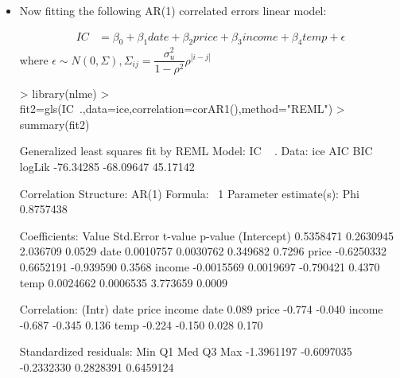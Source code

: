 \documentclass[12pt]{article}
\begin{document}
\begin{itemize}
\item Now fitting the following AR(1) correlated errors linear model: 

\begin{equation*}
\begin{aligned}
IC &= \beta_0 + \beta_1 date +  \beta_2 price + \beta_3 income + \beta_4 temp + \epsilon
\end{aligned}
\end{equation*}
where $\epsilon \sim N(0,\Sigma), \Sigma_{ij}=\dfrac{\sigma_u^2}{1-\rho^2}\rho^{|i-j|}$\\

\begin{Schunk}
\begin{Sinput}
> library(nlme)
> fit2=gls(IC~.,data=ice,correlation=corAR1(),method="REML")
> summary(fit2)
\end{Sinput}
\begin{Soutput}
Generalized least squares fit by REML
  Model: IC ~ . 
  Data: ice 
        AIC       BIC   logLik
  -76.34285 -68.09647 45.17142

Correlation Structure: AR(1)
 Formula: ~1 
 Parameter estimate(s):
      Phi 
0.8757438 

Coefficients:
                 Value Std.Error   t-value p-value
(Intercept)  0.5358471 0.2630945  2.036709  0.0529
date         0.0010757 0.0030762  0.349682  0.7296
price       -0.6250332 0.6652191 -0.939590  0.3568
income      -0.0015569 0.0019697 -0.790421  0.4370
temp         0.0024662 0.0006535  3.773659  0.0009

 Correlation: 
       (Intr) date   price  income
date    0.089                     
price  -0.774 -0.040              
income -0.687 -0.345  0.136       
temp   -0.224 -0.150  0.028  0.170

Standardized residuals:
       Min         Q1        Med         Q3        Max 
-1.3961197 -0.6097035 -0.2332330  0.2828391  0.6459124 


\end{Soutput}
\end{Schunk}
\end{itemize}
\end{document}
